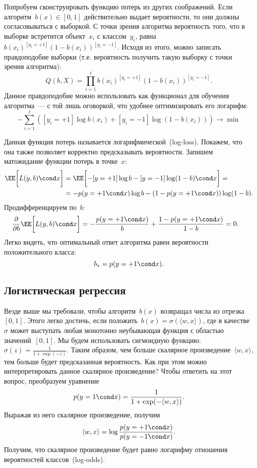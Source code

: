 \documentclass[12pt,fleqn]{article}
\begin{document}
Попробуем сконструировать функцию потерь из других соображений.
Если алгоритм~$b(x) \in [0, 1]$ действительно выдает вероятности, то
они должны согласовываться с выборкой.
С точки зрения алгоритма вероятность того, что в выборке встретится объект~$x_i$ с классом~$y_i$,
равна~$b(x_i)^{[y_i = +1]} (1 - b(x_i))^{[y_i = -1]}$.
Исходя из этого, можно записать правдоподобие выборки (т.е. вероятность получить такую выборку
с точки зрения алгоритма):
\[
    Q(b, X)
    =
    \prod_{i = 1}^{\ell}
        b(x_i)^{[y_i = +1]} (1 - b(x_i))^{[y_i = -1]}.
\]
Данное правдоподобие можно использовать как функционал для обучения алгоритма~---
с той лишь оговоркой, что удобнее оптимизировать его логарифм:
\[
    -\sum_{i = 1}^{\ell} \left(
        [y_i = +1] \log b(x_i)
        +
        [y_i = -1] \log (1 - b(x_i))
    \right)
    \to
    \min
\]

Данная функция потерь называется логарифмической~(log-loss).
Покажем, что она также позволяет корректно предсказывать вероятности.
Запишем матожидание функции потерь в точке~$x$:
\begin{align*}
    \EE \biggl[
        L(y, b)
        \cond
        x
    \biggr]
    &=
    \EE \biggl[
        -[y = +1] \log b - [y = -1] \log(1 - b)
        \cond
        x
    \biggr]
    =\\
    &=
    -p(y = +1 \cond x) \log b
    -
    (1 - p(y = +1 \cond x)) \log(1 - b).
\end{align*}
Продифференцируем по~$b$:
\begin{align*}
    \frac{\partial}{\partial b}
    \EE \biggl[
        L(y, b)
        \cond
        x
    \biggr]
    &=
    -\frac{p(y = +1 \cond x)}{b} + \frac{1 - p(y = +1 \cond x)}{1 - b}
    =
    0.
\end{align*}
Легко видеть, что оптимальный ответ алгоритма равен вероятности положительного класса:
\[
    b_* = p(y = +1 \cond x).
\]

\subsection{Логистическая регрессия}
Везде выше мы требовали, чтобы алгоритм~$b(x)$ возвращал числа из отрезка~$[0, 1]$.
Этого легко достичь, если положить~$b(x) = \sigma(\langle w, x \rangle)$,
где в качестве~$\sigma$ может выступать любая монотонно неубывающая функция
с областью значений~$[0, 1]$.
Мы будем использовать сигмоидную функцию: $\sigma(z) = \frac{1}{1 + \exp(-z)}$.
Таким образом, чем больше скалярное произведение~$\langle w, x \rangle$,
тем больше будет предсказанная вероятность.
Как при этом можно интерпретировать данное скалярное произведение?
Чтобы ответить на этот вопрос, преобразуем уравнение
\[
    p(y = 1 \cond x)
    =
    \frac{1}{1 + \exp(-\langle w, x \rangle)}.
\]
Выражая из него скалярное произведение, получим
\[
    \langle w, x \rangle
    =
    \log
    \frac{
        p(y = +1 \cond x)
    }{
        p(y = -1 \cond x)
    }.
\]
Получим, что скалярное произведение будет равно логарифму отношения
вероятностей классов~(log-odds).
\end{document}
